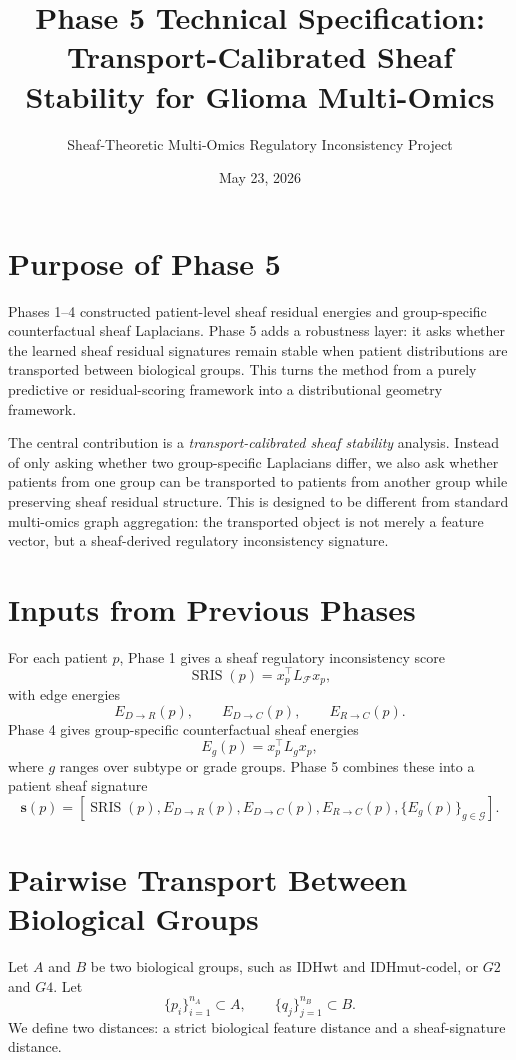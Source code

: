 \documentclass[11pt]{article}
\title{Phase 5 Technical Specification: Transport-Calibrated Sheaf Stability for Glioma Multi-Omics}
\author{Sheaf-Theoretic Multi-Omics Regulatory Inconsistency Project}
\date{May 23, 2026}
\begin{document}
\maketitle
\tableofcontents
\newpage

\section{Purpose of Phase 5}
Phases 1--4 constructed patient-level sheaf residual energies and group-specific counterfactual sheaf Laplacians.  Phase 5 adds a robustness layer: it asks whether the learned sheaf residual signatures remain stable when patient distributions are transported between biological groups.  This turns the method from a purely predictive or residual-scoring framework into a distributional geometry framework.

The central contribution is a \emph{transport-calibrated sheaf stability} analysis.  Instead of only asking whether two group-specific Laplacians differ, we also ask whether patients from one group can be transported to patients from another group while preserving sheaf residual structure.  This is designed to be different from standard multi-omics graph aggregation: the transported object is not merely a feature vector, but a sheaf-derived regulatory inconsistency signature.

\section{Inputs from Previous Phases}
For each patient $p$, Phase 1 gives a sheaf regulatory inconsistency score
\begin{equation}
\operatorname{SRIS}(p)=x_p^{\top}L_{\mathcal F}x_p,
\end{equation}
with edge energies
\begin{equation}
E_{D\to R}(p),\qquad E_{D\to C}(p),\qquad E_{R\to C}(p).
\end{equation}
Phase 4 gives group-specific counterfactual sheaf energies
\begin{equation}
E_g(p)=x_p^{\top}L_gx_p,
\end{equation}
where $g$ ranges over subtype or grade groups.  Phase 5 combines these into a patient sheaf signature
\begin{equation}
\bm{s}(p)=\left[\operatorname{SRIS}(p),E_{D\to R}(p),E_{D\to C}(p),E_{R\to C}(p),\{E_g(p)\}_{g\in\mathcal G}\right].
\end{equation}

\section{Pairwise Transport Between Biological Groups}
Let $A$ and $B$ be two biological groups, such as $\mathrm{IDHwt}$ and $\mathrm{IDHmut\text{-}codel}$, or $G2$ and $G4$.  Let
\begin{equation}
\{p_i\}_{i=1}^{n_A}\subset A,
\qquad
\{q_j\}_{j=1}^{n_B}\subset B.
\end{equation}
We define two distances: a strict biological feature distance and a sheaf-signature distance.
\end{document}
